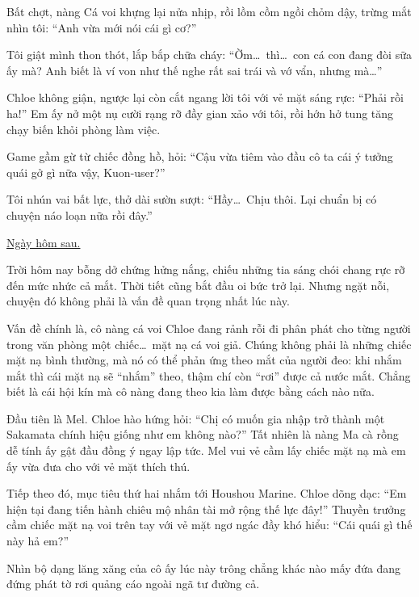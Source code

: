 \documentclass[../main.tex]{subfiles}
\begin{document}
Bất chợt, nàng Cá voi khựng lại nửa nhịp, rồi lồm cồm ngồi chỏm dậy, trừng mắt nhìn tôi: ``Anh vừa mới nói cái gì cơ?''

Tôi giật mình thon thót, lắp bắp chữa cháy: ``Ờm\dots\ thì\dots\ con cá con đang đòi sữa ấy mà? Anh biết là ví von như thế nghe rất sai trái và vớ vẩn, nhưng mà\dots''

Chloe không giận, ngược lại còn cắt ngang lời tôi với vẻ mặt sáng rực: ``Phải rồi ha!'' Em ấy nở một nụ cười rạng rỡ đầy gian xảo với tôi, rồi hớn hở tung tăng chạy biến khỏi phòng làm việc.

Game gầm gừ từ chiếc đồng hồ, hỏi: ``Cậu vừa tiêm vào đầu cô ta cái ý tưởng quái gở gì nữa vậy, Kuon-user?''

Tôi nhún vai bất lực, thở dài sườn sượt: ``Hầy\dots\ Chịu thôi. Lại chuẩn bị có chuyện náo loạn nữa rồi đây.''

\begin{center}
    \uline{Ngày hôm sau.}
\end{center}

Trời hôm nay bỗng dở chứng hửng nắng, chiếu những tia sáng chói chang rực rỡ đến mức nhức cả mắt. Thời tiết cũng bắt đầu oi bức trở lại. Nhưng ngặt nỗi, chuyện đó không phải là vấn đề quan trọng nhất lúc này.

Vấn đề chính là, cô nàng cá voi Chloe đang rảnh rỗi đi phân phát cho từng người trong văn phòng một chiếc\dots\ mặt nạ cá voi giả. Chúng không phải là những chiếc mặt nạ bình thường, mà nó có thể phản ứng theo mắt của người đeo: khi nhắm mắt thì cái mặt nạ sẽ ``nhắm'' theo, thậm chí còn ``rơi'' được cả nước mắt. Chẳng biết là cái hội kín mà cô nàng đang theo kia làm được bằng cách nào nữa.

Đầu tiên là Mel. Chloe hào hứng hỏi: ``Chị có muốn gia nhập trở thành một Sakamata chính hiệu giống như em không nào?'' Tất nhiên là nàng Ma cà rồng dễ tính ấy gật đầu đồng ý ngay lập tức. Mel vui vẻ cầm lấy chiếc mặt nạ mà em ấy vừa đưa cho với vẻ mặt thích thú.


Tiếp theo đó, mục tiêu thứ hai nhắm tới Houshou Marine. Chloe dõng dạc: ``Em hiện tại đang tiến hành chiêu mộ nhân tài mở rộng thế lực đây!'' Thuyền trưởng cầm chiếc mặt nạ voi trên tay với vẻ mặt ngơ ngác đầy khó hiểu: ``Cái quái gì thế này hả em?''


Nhìn bộ dạng lăng xăng của cô ấy lúc này trông chẳng khác nào mấy đứa đang đứng phát tờ rơi quảng cáo ngoài ngã tư đường cả.
\end{document}
